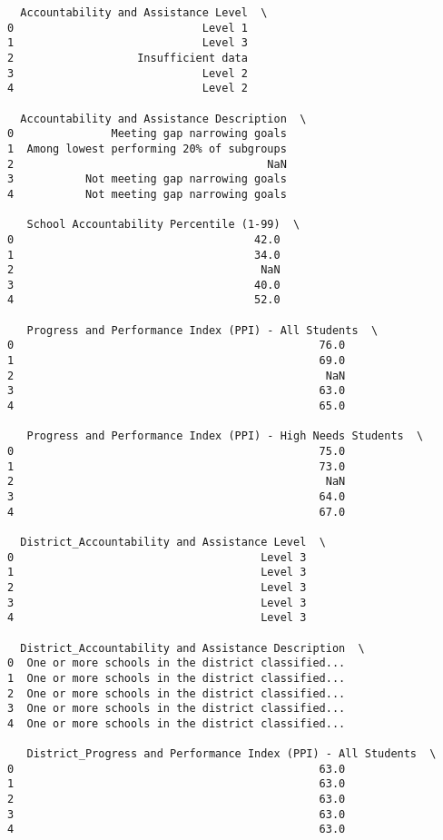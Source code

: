 \documentclass[11pt]{article}
\begin{document}
\begin{verbatim}
  Accountability and Assistance Level  \
0                             Level 1   
1                             Level 3   
2                   Insufficient data   
3                             Level 2   
4                             Level 2   

  Accountability and Assistance Description  \
0               Meeting gap narrowing goals   
1  Among lowest performing 20% of subgroups   
2                                       NaN   
3           Not meeting gap narrowing goals   
4           Not meeting gap narrowing goals   

   School Accountability Percentile (1-99)  \
0                                     42.0   
1                                     34.0   
2                                      NaN   
3                                     40.0   
4                                     52.0   

   Progress and Performance Index (PPI) - All Students  \
0                                               76.0     
1                                               69.0     
2                                                NaN     
3                                               63.0     
4                                               65.0     

   Progress and Performance Index (PPI) - High Needs Students  \
0                                               75.0            
1                                               73.0            
2                                                NaN            
3                                               64.0            
4                                               67.0            

  District_Accountability and Assistance Level  \
0                                      Level 3   
1                                      Level 3   
2                                      Level 3   
3                                      Level 3   
4                                      Level 3   

  District_Accountability and Assistance Description  \
0  One or more schools in the district classified...   
1  One or more schools in the district classified...   
2  One or more schools in the district classified...   
3  One or more schools in the district classified...   
4  One or more schools in the district classified...   

   District_Progress and Performance Index (PPI) - All Students  \
0                                               63.0              
1                                               63.0              
2                                               63.0              
3                                               63.0              
4                                               63.0              


\end{verbatim}
\end{document}
